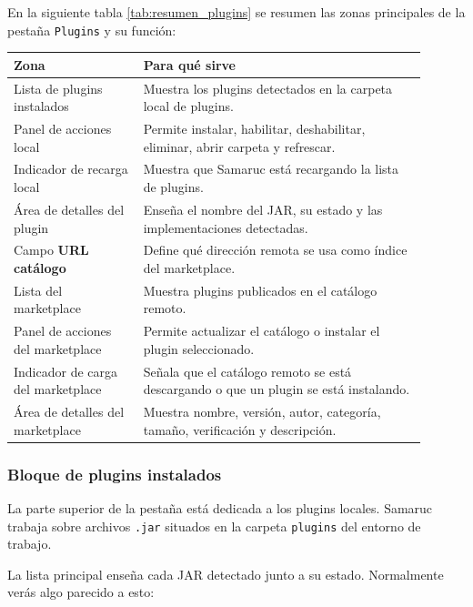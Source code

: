 \documentclass[../../main.tex]{subfiles}
\begin{document}
En la siguiente tabla \ref{tab:resumen_plugins} se resumen las zonas principales de la pestaña \texttt{Plugins} y su función:
\begin{table}[!htb]
    \centering
    \begin{tabular}{|p{0.29\linewidth}|p{0.61\linewidth}|}
        \hline
        \textbf{Zona} & \textbf{Para qué sirve} \\
        \hline
        Lista de plugins instalados & Muestra los plugins detectados en la carpeta local de plugins. \\
        \hline
        Panel de acciones local & Permite instalar, habilitar, deshabilitar, eliminar, abrir carpeta y refrescar. \\
        \hline
        Indicador de recarga local & Muestra que Samaruc está recargando la lista de plugins. \\
        \hline
        Área de detalles del plugin & Enseña el nombre del JAR, su estado y las implementaciones detectadas. \\
        \hline
        Campo \textbf{URL catálogo} & Define qué dirección remota se usa como índice del marketplace. \\
        \hline
        Lista del marketplace & Muestra plugins publicados en el catálogo remoto. \\
        \hline
        Panel de acciones del marketplace & Permite actualizar el catálogo o instalar el plugin seleccionado. \\
        \hline
        Indicador de carga del marketplace & Señala que el catálogo remoto se está descargando o que un plugin se está instalando. \\
        \hline
        Área de detalles del marketplace & Muestra nombre, versión, autor, categoría, tamaño, verificación y descripción. \\
        \hline
    \end{tabular}
    
\end{table}
\label{tab:resumen_plugins}

\subsubsection{Bloque de plugins instalados}

La parte superior de la pestaña está dedicada a los plugins locales. Samaruc trabaja sobre archivos \texttt{.jar} situados en la carpeta \texttt{plugins} del entorno de trabajo.

La lista principal enseña cada JAR detectado junto a su estado. Normalmente verás algo parecido a esto:
\end{document}
